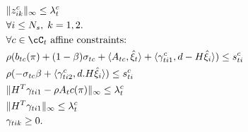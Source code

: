 \documentclass[11pt,a4paper,oneside,openany]{book}
\numberwithin{definition}{section}
\numberwithin{theorem}{section}
\numberwithin{problem}{section}
\begin{document}
\begin{align*}
& \|z_{ik}^c\|_{\infty} \leq \lambda_t^c \nonumber \\
& \forall i \leq N_s,\; k  =1, 2. \nonumber \\
&\forall c \in \cC_t  \text{ affine constraints:} \\
&\rho(b_{tc}(\pi)+ (1-\beta)\sigma_{tc} + \langle A_{tc}, \hat \xi_t \rangle + \langle \gamma_{ti1}^c ,  d - H \hat \xi_i \rangle) \leq s_{ti}^c \\
& \rho (-\sigma_{tc}\beta  + \langle \gamma_{ti2}^c ,  d . H \hat \xi_i \rangle) \leq s_{ti}^c \\
& \|H^T\gamma_{ti1} - \rho A_tc(\pi)\|_{\infty} \leq \lambda_t^c \\
& \|H^T\gamma_{ti1} \|_{\infty} \leq \lambda_t^c \\
& \gamma_{tik} \geq 0 . \\
\end{align*}
\end{document}

